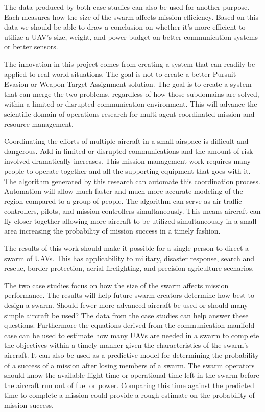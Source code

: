 The data produced by both case studies can also be used for another purpose.  Each measures how the size of the swarm affects mission efficiency.  Based on this data we should be able to draw a conclusion on whether it’s more efficient to utilize a UAV’s size, weight, and power budget on better communication systems or better sensors.

The innovation in this project comes from creating a system that can readily be applied to real world situations.  The goal is not to create a better Pursuit-Evasion or Weapon Target Assignment solution.  The goal is to create a system that can merge the two problems, regardless of how those subdomains are solved, within a limited or disrupted communication environment.  This will advance the scientific domain of operations research for multi-agent coordinated mission and resource management.

Coordinating the efforts of multiple aircraft in a small airspace is difficult and dangerous.  Add in limited or disrupted communications and the amount of risk involved dramatically increases.  This mission management work requires many people to operate together and all the supporting equipment that goes with it. The algorithm generated by this research can automate this coordination process.  Automation will allow much faster and much more accurate modeling of the region compared to a group of people.  The algorithm can serve as air traffic controllers, pilots, and mission controllers simultaneously.  This means aircraft can fly closer together allowing more aircraft to be utilized simultaneously in a small area increasing the probability of mission success in a timely fashion.

The results of this work should make it possible for a single person to direct a swarm of UAVs.   This has applicability to military, disaster response, search and rescue, border protection, aerial firefighting, and precision agriculture scenarios.

The two case studies focus on how the size of the swarm affects mission performance.  The results will help future swarm creators determine how best to design a swarm.  Should fewer more advanced aircraft be used or should many simple aircraft be used?  The data from the case studies can help answer these questions.   Furthermore the equations derived from the communication manifold case can be used to estimate how many UAVs are needed in a swarm to complete the objectives within a timely manner given the characteristics of the swarm’s aircraft.  It can also be used as a predictive model for determining the probability of a success of a mission after losing members of a swarm.  The swarm operators should know the available flight time or operational time left in the swarm before the aircraft run out of fuel or power.  Comparing this time against the predicted time to complete a mission could provide a rough estimate on the probability of mission success.